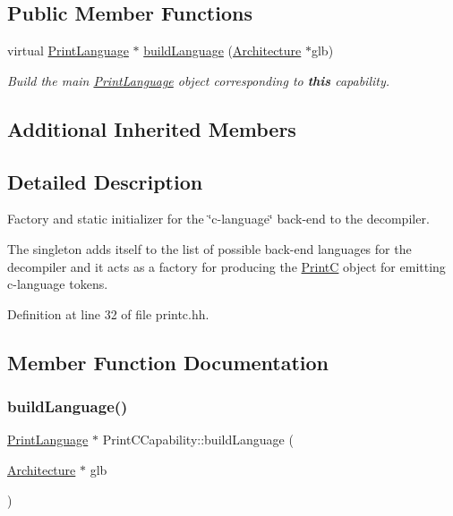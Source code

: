 \subsection*{Public Member Functions}
\begin{DoxyCompactItemize}
\item 
virtual \mbox{\hyperlink{class_print_language}{Print\+Language}} $\ast$ \mbox{\hyperlink{class_print_c_capability_a248a6da5b381c20a11eb43e11f58f60f}{build\+Language}} (\mbox{\hyperlink{class_architecture}{Architecture}} $\ast$glb)
\begin{DoxyCompactList}\small\item\em Build the main \mbox{\hyperlink{class_print_language}{Print\+Language}} object corresponding to {\bfseries{this}} capability. \end{DoxyCompactList}\end{DoxyCompactItemize}
\subsection*{Additional Inherited Members}


\subsection{Detailed Description}
Factory and static initializer for the \char`\"{}c-\/language\char`\"{} back-\/end to the decompiler. 

The singleton adds itself to the list of possible back-\/end languages for the decompiler and it acts as a factory for producing the \mbox{\hyperlink{class_print_c}{PrintC}} object for emitting c-\/language tokens. 

Definition at line 32 of file printc.\+hh.



\subsection{Member Function Documentation}
\mbox{\label{class_print_c_capability_a248a6da5b381c20a11eb43e11f58f60f}} 
\subsubsection{\texorpdfstring{buildLanguage()}{buildLanguage()}}
{\footnotesize\ttfamily \mbox{\hyperlink{class_print_language}{Print\+Language}} $\ast$ Print\+C\+Capability\+::build\+Language (\begin{DoxyParamCaption}\item[{\mbox{\hyperlink{class_architecture}{Architecture}} $\ast$}]{glb }\end{DoxyParamCaption})\hspace{0.3cm}{\ttfamily [virtual]}}



